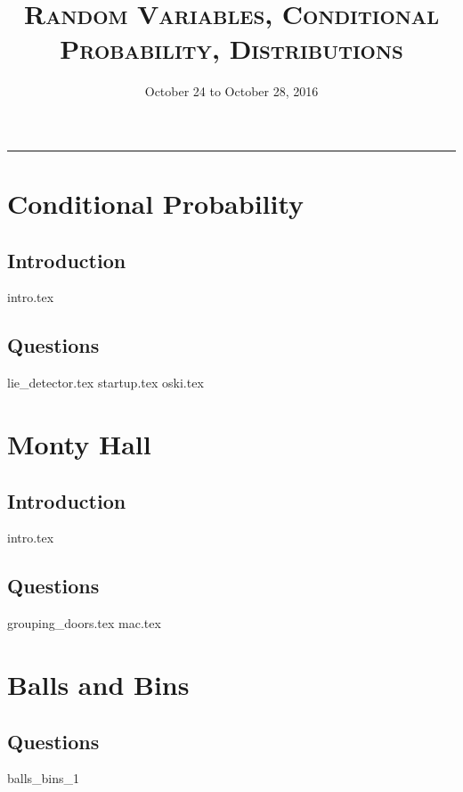 \documentclass{exam}
\title{\textsc{Random Variables, Conditional Probability, Distributions}}
\date{October 24 to October 28, 2016}
\begin{document}
\maketitle
\rule{\textwidth}{0.15em}
\fontsize{12}{15}\selectfont
\thispagestyle{empty}

\section{Conditional Probability}
\subsection{Introduction}
{intro.tex}
\subsection{Questions}
\begin{questions}
{lie_detector.tex}
{startup.tex}
{oski.tex}
\end{questions}

\section{Monty Hall}
\subsection{Introduction}
{intro.tex}
\subsection{Questions}
\begin{questions}
{grouping_doors.tex}
{mac.tex}
\end{questions}

\section{Balls and Bins}
\begin{questions}
\subsection{Questions}
{balls_bins_1}
\end{questions}
\end{document}
